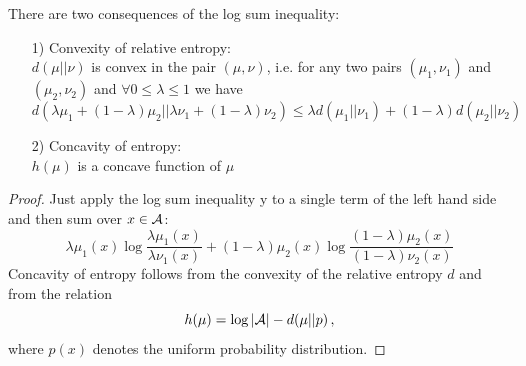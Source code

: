 There are two consequences of the log sum inequality:
\begin{theorem}
\hfill
    \begin{itemize}
        \item[1)] Convexity of relative entropy:
        \\$d(\mu || \nu)$ is convex in the pair $(\mu, \nu)$, i.e. for any two pairs $(\mu_1, \nu_1)$ and $(\mu_2, \nu_2)$  and $\forall 0 \leq \lambda \leq 1$ we have 
        \begin{equation*}
            d(\lambda \mu_1 + (1 - \lambda) \mu_2 || \lambda \nu_1 + (1 - \lambda) \nu_2 ) \leq \lambda d (\mu_1 || \nu_1) + (1 - \lambda) d (\mu_2 || \nu_2)
        \end{equation*}
        \item[2)] Concavity of entropy:
        \\$h(\mu)$ is a concave function of $\mu$
    \end{itemize}
\end{theorem}
\begin{proof}
    \hfill
    Just apply the log sum inequality y to a single term of the left hand side and then sum over $x \in \mathcal{A}$:
    \begin{equation*}
        \lambda \mu_1(x) \log \frac{\lambda \mu_1 (x)}{\lambda \nu_1 (x)} + (1 - \lambda) \mu_2(x) \log \frac{(1 - \lambda) \mu_2(x)}{(1 - \lambda) \nu_2(x)}
    \end{equation*}
    Concavity of entropy  follows from the convexity of the relative entropy $d$ and from the relation
    \begin{equation*}
        h(\mu) = \log |\mathcal{A}| - d (\mu || p) \, ,
    \end{equation*}
    where $p(x)$ denotes the uniform probability distribution.
\end{proof}






